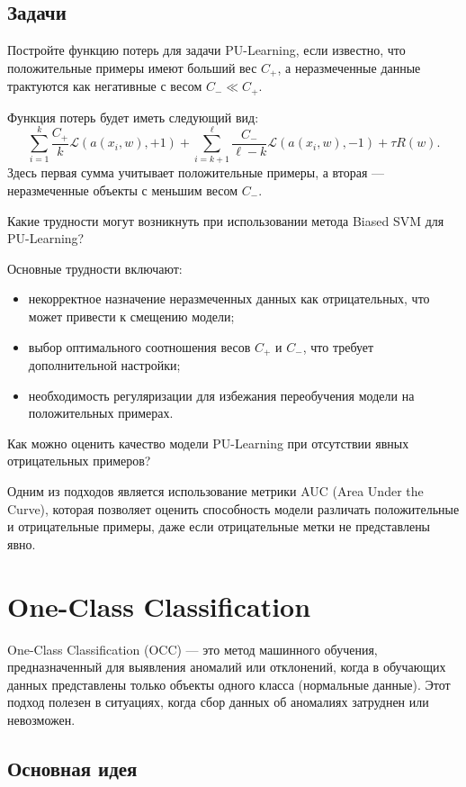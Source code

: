 \subsection{Задачи}

\problem Постройте функцию потерь для задачи PU-Learning, если известно, что положительные примеры имеют больший вес \( C_+ \), а неразмеченные данные трактуются как негативные с весом \( C_- \ll C_+ \).

\solution Функция потерь будет иметь следующий вид:
\[
    \sum_{i=1}^k \frac{C_+}{k} \mathcal{L}(a(x_i, w), +1) + \sum_{i=k+1}^\ell \frac{C_-}{\ell - k} \mathcal{L}(a(x_i, w), -1) + \tau R(w).
\]
Здесь первая сумма учитывает положительные примеры, а вторая — неразмеченные объекты с меньшим весом \( C_- \).

\problem Какие трудности могут возникнуть при использовании метода Biased SVM для PU-Learning?

\solution Основные трудности включают:
\begin{itemize}
    \item некорректное назначение неразмеченных данных как отрицательных, что может привести к смещению модели;
    \item выбор оптимального соотношения весов \( C_+ \) и \( C_- \), что требует дополнительной настройки;
    \item необходимость регуляризации для избежания переобучения модели на положительных примерах.
\end{itemize}

\problem Как можно оценить качество модели PU-Learning при отсутствии явных отрицательных примеров?

\solution Одним из подходов является использование метрики AUC (Area Under the Curve), которая позволяет оценить способность модели различать положительные и отрицательные примеры, даже если отрицательные метки не представлены явно.

\section{One-Class Classification}

One-Class Classification (OCC) — это метод машинного обучения, предназначенный для выявления аномалий или отклонений, когда в обучающих данных представлены только объекты одного класса (нормальные данные). Этот подход полезен в ситуациях, когда сбор данных об аномалиях затруднен или невозможен.

\subsection{Основная идея}

